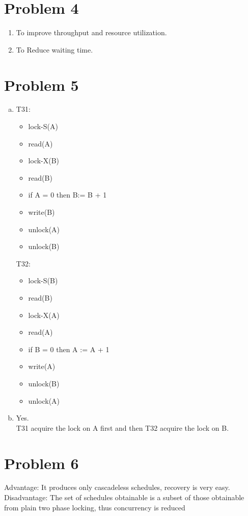 \documentclass[a4paper,11pt]{article}
\begin{document}
\section*{Problem 4}
\begin{enumerate}
\item
To improve throughput and resource utilization.
\item
To Reduce waiting time.
\end{enumerate}
\section*{Problem 5}
\begin{enumerate}[a.]
\item
T31:
\begin{itemize}%
\item[] lock-S(A)
\item[] read(A)
\item[] lock-X(B)
\item[] read(B)
\item[] if A = 0 then B:= B + 1 
\item[] write(B)
\item[] unlock(A)
\item[] unlock(B)
\end{itemize}
T32:
\begin{itemize}
\item[] lock-S(B)
\item[]read(B)
\item[]lock-X(A)
\item[]read(A)
\item[]if B = 0 then A := A + 1
\item[]write(A)
\item[]unlock(B)
\item[]unlock(A)
\end{itemize}
\item
Yes.\\
T31 acquire the lock on A first and then T32 acquire the lock on B.
\end{enumerate}

\section*{Problem 6}
Advantage: It produces only cascadeless schedules, recovery is very easy.\\
Disadvantage: The set of schedules obtainable is a subset of those obtainable from plain two phase locking, thus concurrency is reduced\\
\end{document}

